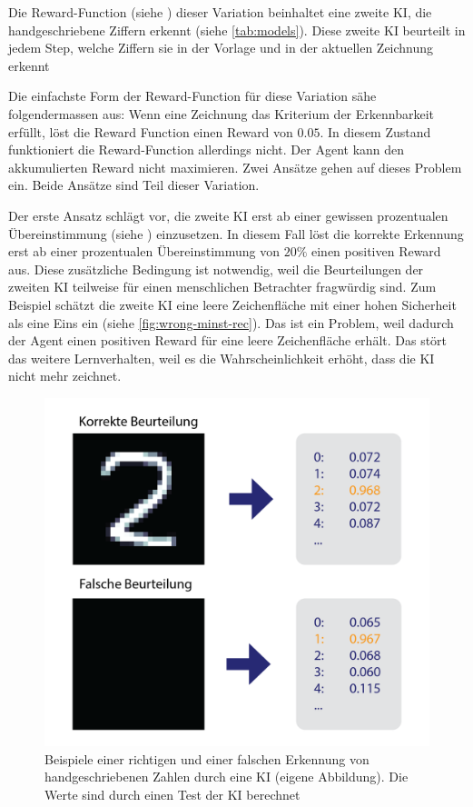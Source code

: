 Die Reward-Function (siehe ) dieser Variation beinhaltet
eine zweite KI, die handgeschriebene Ziffern erkennt (siehe
\autoref{tab:models}). Diese zweite KI beurteilt in jedem Step, welche
Ziffern sie in der Vorlage und in der aktuellen  %
Zeichnung erkennt

Die einfachste Form der Reward-Function für diese Variation sähe
folgendermassen aus: Wenn eine Zeichnung das Kriterium der Erkennbarkeit
erfüllt, löst die Reward Function einen Reward von $0.05$. In diesem Zustand
funktioniert die Reward-Function allerdings nicht. Der Agent kann den
akkumulierten Reward nicht maximieren. Zwei Ansätze gehen auf dieses Problem
ein. Beide Ansätze sind Teil dieser Variation.

Der erste Ansatz schlägt vor, die zweite KI erst ab einer gewissen prozentualen
Übereinstimmung (siehe ) einzusetzen. In diesem Fall
löst die korrekte Erkennung erst ab einer prozentualen Übereinstimmung von
$20\%$ einen positiven Reward aus. Diese zusätzliche Bedingung ist notwendig,
weil die Beurteilungen der zweiten KI teilweise für einen menschlichen
Betrachter fragwürdig sind. Zum Beispiel schätzt die zweite KI eine leere
Zeichenfläche mit einer hohen Sicherheit als eine Eins ein (siehe
\autoref{fig:wrong-minst-rec}). Das ist ein Problem, weil dadurch der Agent
einen positiven Reward für eine leere Zeichenfläche erhält. Das stört das
weitere Lernverhalten, weil es die Wahrscheinlichkeit erhöht, dass die KI nicht
mehr zeichnet.

\begin{figure}[!ht]
  \centering
  \includegraphics[width=\textwidth]{images/methode/wrong-mnist-rec.png}
  \caption{Beispiele einer richtigen und einer falschen Erkennung von handgeschriebenen Zahlen durch eine KI (eigene Abbildung). Die Werte sind durch einen Test der KI berechnet}\label{fig:wrong-mnist-rec}
\end{figure}

